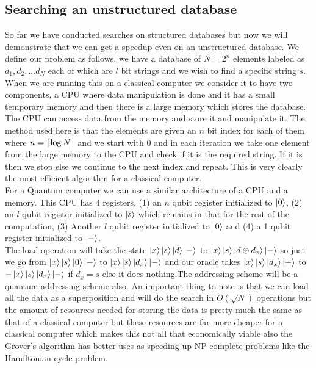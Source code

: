 \documentclass{report}
\DeclarePairedDelimiter{\ceil}{\lceil}{\rceil}
\begin{document}
\subsection{Searching an unstructured database}
So far we have conducted searches on structured databases but now we will demonstrate that we can get a speedup even on an unstructured database. We define our problem as follows, we have a database of $N = 2^{n}$ elements labeled as $d_1,d_2,...d_N$ each of which are $l$ bit strings and we wish to find a specific string $s$.\\
When we are running this on a classical computer we consider it to have two components, a CPU where data manipulation is done and it has a small temporary memory and then there is a large memory which stores the database. The CPU can access data from the memory and store it and manipulate it. The method used here is that the elements are given an $n$ bit index for each of them where $n = \ceil{\log{N}}$ and we start with 0 and in each iteration we take one element from the large memory to the CPU and check if it is the required string. If it is then we stop else we continue to the next index and repeat. This is very clearly the most efficient algorithm for a classical computer.\\
For a Quantum computer we can use a similar architecture of a CPU and a memory. This CPU has 4 registers, (1) an $n$ qubit register initialized to $\ket{0}$, (2) an $l$ qubit register initialized to $\ket{s}$ which remains in that for the rest of the computation, (3) Another $l$ qubit register initialized to $\ket{0}$ and (4) a 1 qubit register initialized to $\ket{-}$.\\
The load operation will take the state $\ket{x}\ket{s}\ket{d}\ket{-}$ to $\ket{x}\ket{s}\ket{d \oplus d_x}\ket{-}$ so just we go from $\ket{x}\ket{s}\ket{0}\ket{-}$ to $\ket{x}\ket{s}\ket{d_x}\ket{-}$ and our oracle takes $\ket{x}\ket{s}\ket{d_x}\ket{-}$ to $-\ket{x}\ket{s}\ket{d_x}\ket{-}$ if $d_x = s$ else it does nothing.The addressing scheme will be a quantum addressing scheme also. An important thing to note is that we can load all the data as a superposition and will do the search in $O(\sqrt{N})$ operations but the amount of resources needed for storing the data is pretty much the same as that of a classical computer but these resources are far more cheaper for a classical computer which makes this not all that economically viable also the Grover's algorithm has better uses as speeding up NP complete problems like the Hamiltonian cycle problem.
\end{document}
